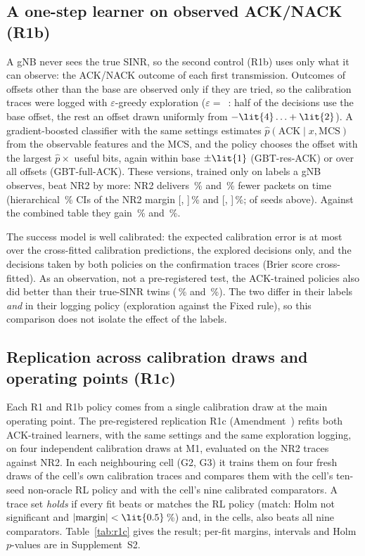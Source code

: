 \subsection{A one-step learner on observed ACK/NACK (R1b)}\label{sec:r1b}
A gNB never sees the true SINR, so the second control (R1b) uses only what it can observe: the ACK/NACK outcome of each first transmission. Outcomes of offsets other than the base are observed only if they are tried, so the calibration traces were logged with $\varepsilon$-greedy exploration ($\varepsilon=$~\NPSExplEps: half of the decisions use the base offset, the rest an offset drawn uniformly from $-\lit{4}\ldots+\lit{2}$). A gradient-boosted classifier with the same settings estimates $\hat p(\text{ACK}\mid x,\text{MCS})$ from the observable features and the MCS, and the policy chooses the offset with the largest $\hat p\times$ useful bits, again within base $\pm\lit{1}$ (GBT-res-ACK) or over all offsets (GBT-full-ACK). These versions, trained only on labels a gNB observes, beat NR2 by more: NR2 delivers \NPSGbtResAckAdv\,\% and \NPSGbtFullAckAdv\,\% fewer packets on time (hierarchical \NLevHier\,\% CIs of the NR2 margin [\NPSGbtResAckHierLo, \NPSGbtResAckHierHi]\,\% and [\NPSGbtFullAckHierLo, \NPSGbtFullAckHierHi]\,\%; \NPSGbtFullAckSeeds{} of \NCfgSeeds{} seeds above). Against the combined table they gain \NPSGbtResAckOverCtxJ\,\% and \NPSGbtFullAckOverCtxJ\,\%.

The success model is well calibrated: the expected calibration error is at most \NPSEceMax{} over the cross-fitted calibration predictions, the explored decisions only, and the decisions taken by both policies on the confirmation traces (Brier score \NPSBrierXfit{} cross-fitted). As an observation, not a pre-registered test, the ACK-trained policies also did better than their true-SINR twins (\NPSTwinGbtResAck\,\% and \NPSTwinGbtFullAck\,\%). The two differ in their labels \emph{and} in their logging policy (exploration against the Fixed rule), so this comparison does not isolate the effect of the labels.

\subsection{Replication across calibration draws and operating points (R1c)}\label{sec:r1c}
Each R1 and R1b policy comes from a single calibration draw at the main operating point. The pre-registered replication R1c (Amendment~) refits both ACK-trained learners, with the same settings and the same exploration logging, on four independent calibration draws at M1, evaluated on the NR2 traces against NR2. In each neighbouring cell (G2, G3) it trains them on four fresh draws of the cell's own calibration traces and compares them with the cell's ten-seed non-oracle RL policy and with the cell's nine calibrated comparators. A trace set \emph{holds} if every fit beats or matches the RL policy (match: Holm not significant and $|\text{margin}|<\lit{0.5}$\,\%) and, in the cells, also beats all nine comparators. Table~\ref{tab:r1c} gives the result; per-fit margins, intervals and Holm $p$-values are in Supplement~S2.

